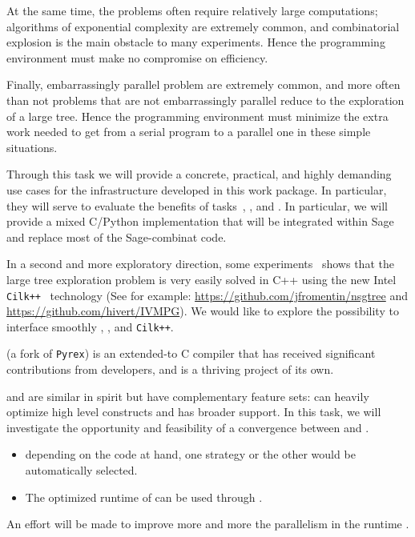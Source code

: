 \begin{workpackage}
\begin{tasklist}
\begin{task}[title=HPC infrastructure for combinatorics,id=hpc-combi,PM=26,lead=PS,partners={UB}]
  At the same time, the problems often require relatively large
  computations; algorithms of exponential complexity are extremely
  common, and combinatorial explosion is the main obstacle to many
  experiments. Hence the programming environment must make no
  compromise on efficiency.

  Finally, embarrassingly parallel problem are extremely common, and
  more often than not problems that are not embarrassingly parallel
  reduce to the exploration of a large tree. Hence the programming
  environment must minimize the extra work needed to get from a serial
  program to a parallel one in these simple situations.

  Through this task we will provide a concrete, practical, and highly
  demanding use cases for the infrastructure developed in this work
  package. In particular, they will serve to evaluate the benefits of
  tasks~,
  , and
  .
  In particular, we will provide a mixed C/Python implementation that
  will be integrated within Sage and replace most of the Sage-combinat code.

  In a second and more exploratory direction, some
  experiments~\cite{FromentinHivert} shows that the large tree exploration
  problem is very easily solved in C++ using the new Intel
  \texttt{Cilk++}~\cite{CilkIntel,CilkRefman} technology (See for example:
  \href{https://github.com/jfromentin/nsgtree}{https://github.com/jfromentin/nsgtree}
  and
  \href{https://github.com/hivert/IVMPG}{https://github.com/hivert/IVMPG}). We
  would like to explore the possibility to interface smoothly \Pythran,
  \Cython, and \texttt{Cilk++}.
\end{task}

\begin{task}[title=Pythran,id=pythran,lead=LL,partners={UJF},PM=24]
  \Cython (a fork of \texttt{Pyrex}) is an extended-\Python to C
  compiler that has received significant contributions from \Sage
  developers, and is a thriving project of its own.

  \Pythran and \Cython are similar in spirit but have complementary feature
  sets: \Pythran can heavily optimize high level \Numpy constructs and \Cython
  has broader \Python support. In this task, we will investigate the
  opportunity and feasibility of a convergence between \Cython and \Pythran.
  \begin{itemize}
    \item depending on the code at hand, one strategy or the other would be automatically selected.
    \item The optimized runtime of \Pythran can be used through \Cython.
  \end{itemize}
  An effort will be made to improve more and more the parallelism in the
  \Pythran runtime .


\end{task}
\end{tasklist}
\end{workpackage}
